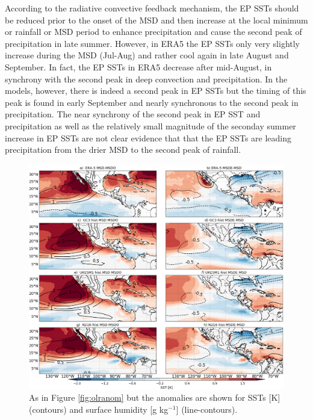 According to the radiative convective feedback mechanism, the EP SSTs should be reduced prior to the onset of the MSD and then increase at the local minimum or rainfall or MSD period to enhance precipitation and cause the second peak of precipitation in late summer. However, in ERA5 the EP SSTs only very slightly increase during the MSD (Jul-Aug) and rather cool again in late August and September. In fact, the EP SSTs in ERA5 decrease after mid-August, in synchrony with the second peak in deep convection and precipitation. 
 In the models, however, there is indeed a second peak in EP SSTs but the timing of this peak is found in early September and nearly synchronous to the second peak in precipitation. The near synchrony of the second peak in EP SST and precipitation as well as the relatively small magnitude of the seconday summer increase in EP SSTs are not clear evidence that that the EP SSTs are leading precipitation from the drier MSD to the second peak of rainfall. 
 
 




\begin{figure}[t!]
\includegraphics[width=\linewidth]{figures/fig4_sstv_3.png}
\caption{As in Figure \ref{fig:olranom} but the anomalies are shown for SSTs [K] (contours) and surface humidity [g kg$^{-1}$] (line-contours).  }
\label{fig:msdsstanom}
\end{figure}

